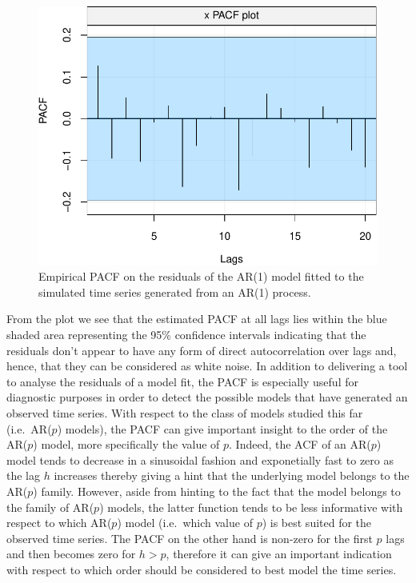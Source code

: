 \documentclass[]{book}
\theoremstyle{definition}
\theoremstyle{definition}
\theoremstyle{definition}
\theoremstyle{remark}
\begin{document}
\begin{figure}

{\centering \includegraphics{ts_files/figure-latex/unnamed-chunk-41-1} 

}

\caption{Empirical PACF on the residuals of the AR(1) model fitted to the simulated time series generated from an AR(1) process.}\label{fig:unnamed-chunk-41}
\end{figure}

From the plot we see that the estimated PACF at all lags lies within the
blue shaded area representing the 95\% confidence intervals indicating
that the residuals don't appear to have any form of direct
autocorrelation over lags and, hence, that they can be considered as
white noise. In addition to delivering a tool to analyse the residuals
of a model fit, the PACF is especially useful for diagnostic purposes in
order to detect the possible models that have generated an observed time
series. With respect to the class of models studied this far
(i.e.~AR(\(p\)) models), the PACF can give important insight to the
order of the AR(\(p\)) model, more specifically the value of \(p\).
Indeed, the ACF of an AR(\(p\)) model tends to decrease in a sinusoidal
fashion and exponetially fast to zero as the lag \(h\) increases thereby
giving a hint that the underlying model belongs to the AR(\(p\)) family.
However, aside from hinting to the fact that the model belongs to the
family of AR(\(p\)) models, the latter function tends to be less
informative with respect to which AR(\(p\)) model (i.e.~which value of
\(p\)) is best suited for the observed time series. The PACF on the
other hand is non-zero for the first \(p\) lags and then becomes zero
for \(h > p\), therefore it can give an important indication with
respect to which order should be considered to best model the time
series.
\end{document}
